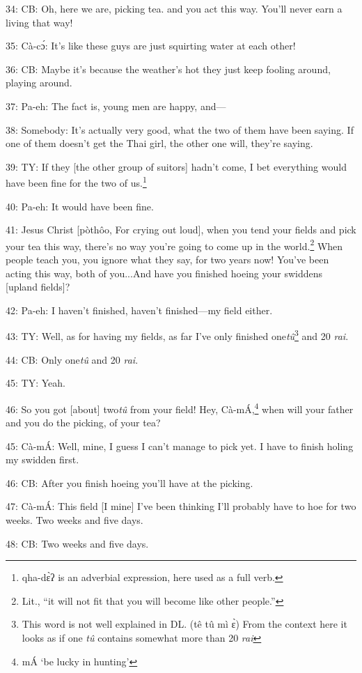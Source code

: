 34: CB: Oh, here we are, picking tea. and you act this way.  You'll never earn
a living that way!

35: Cà-cɔ́: It's like these guys are just squirting water at each other!

36: CB: Maybe it's because the weather's hot they just keep fooling around, playing
around.

37: Pa-eh: The fact is, young men are happy, and---

38: Somebody: It's actually very good, what the two of them have been saying.
If one of them doesn't get the Thai girl, the other one will, they're saying.

39: TY: If they [the other group of suitors] hadn't come, I bet everything would
have been fine for the two of us.\footnote{qha-dɛ̀ʔ is an adverbial expression, here used as a full verb.}

40: Pa-eh: It would have been fine.

41: Jesus Christ [pòthôo, For crying out loud], when you tend your fields and
pick your tea this way, there's no way you're going to come up in the world.\footnote{Lit., ``it will not fit that you will become like other people.''}
When people teach you, you ignore what they say, for two years now!  You've been
acting this way, both of you...And have you finished hoeing your swiddens [upland
fields]?

42: Pa-eh: I haven't finished, haven't finished---my field either.

43: TY: Well, as for having my fields, as far I've only finished one\textit{tû}\footnote{This word is not well explained in DL. (tê tû mì ɛ̀) From the context here it looks as if one \textit{tû} contains somewhat more than 20 \textit{rai}}
and 20 \textit{rai}.

44: CB: Only one\textit{tû} and 20 \textit{rai}.

45: TY: Yeah.

46: So you got [about] two\textit{tû }from your field!  Hey, Cà-mÁ,\footnote{mÁ `be lucky in hunting'} when
will your father and you do the picking, of your tea?

45: Cà-mÁ: Well, mine, I guess I can't manage to pick yet.  I have to finish
holing my swidden first.

46: CB: After you finish hoeing you'll have at the picking.

47: Cà-mÁ: This field [I mine] I've been thinking I'll probably have to hoe for
two weeks.  Two weeks and five days.

48: CB: Two weeks and five days.

